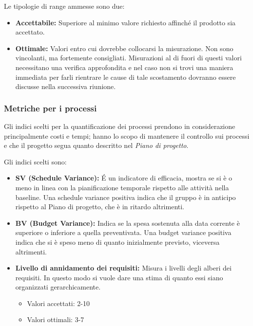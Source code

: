 \documentclass[a4paper]{article}
\begin{document}
			Le tipologie di range ammesse sono due:
			\begin{itemize}
				\item \textbf{Accettabile:} Superiore al minimo valore richiesto affinché il prodotto sia accettato.
				\item \textbf{Ottimale:} Valori entro cui dovrebbe collocarsi la misurazione. Non sono vincolanti,
				ma fortemente consigliati. Misurazioni al di fuori di questi valori necessitano una verifica approfondita e nel
				caso non si trovi una maniera immediata per farli rientrare le cause di tale scostamento dovranno essere
				discusse nella successiva riunione.
			\end{itemize}
			\subsubsection{Metriche per i processi}
				Gli indici scelti per la quantificazione dei processi prendono in considerazione principalmente costi e tempi;
				hanno lo scopo di mantenere il controllo sui processi e che il progetto segua quanto descritto nel \emph{Piano di
				progetto}.
				
				Gli indici scelti sono:
				\begin{itemize}
					\item \textbf{SV (Schedule Variance):} É un indicatore di efficacia, mostra se si è o meno in linea con la
					pianificazione temporale rispetto alle attività nella baseline. Una schedule variance positiva indica che il
					gruppo è in anticipo rispetto al Piano di progetto, che è in ritardo altrimenti.
					\item \textbf{BV (Budget Variance):} Indica se la spesa sostenuta alla data corrente è superiore o inferiore a
					quella preventivata. Una budget variance positiva indica che si è speso meno di quanto inizialmente previsto,
					viceversa altrimenti.	
				
				
				\item \textbf{Livello di annidamento dei requisiti:}
				Misura i livelli degli alberi dei requisiti. In questo modo si vuole dare una stima di quanto essi
				siano organizzati gerarchicamente.
				\begin{itemize}
					\item Valori accettati: 2-10
							\item Valori ottimali: 3-7
				\end{itemize}	
			\end{itemize}
				
\end{document}
